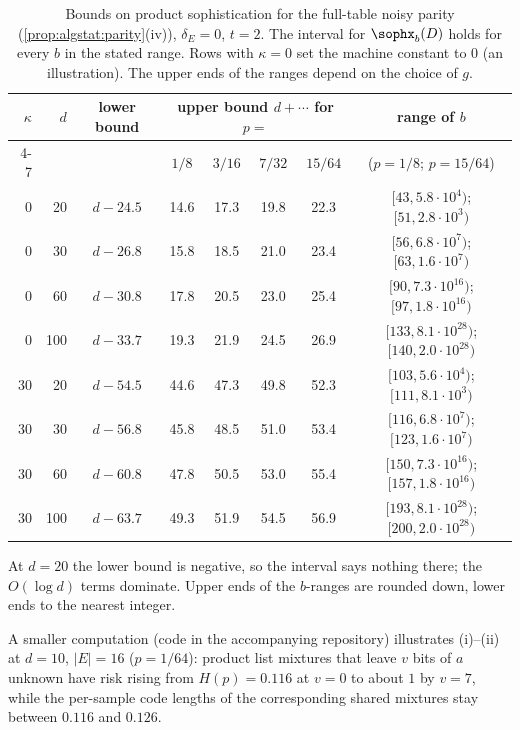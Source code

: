 \begin{table}[ht]
\centering\footnotesize\setlength{\tabcolsep}{3.5pt}
\caption{Bounds on product sophistication for the full-table noisy parity (\cref{prop:algstat:parity}(iv)), $\delta_E=0$, $t=2$. The interval for $\sophx_b(D)$ holds for every $b$ in the stated range. Rows with $\kappa=0$ set the machine constant to $0$ (an illustration). The upper ends of the ranges depend on the choice of $g$.}\label{tab:algstat:numbers}
\begin{tabular}{rrcccccc}
\toprule
$\kappa$ & $d$ & lower bound & \multicolumn{4}{c}{upper bound $d+\cdots$ for $p=$} & range of $b$ \\
\cmidrule(lr){4-7}
 & & & $1/8$ & $3/16$ & $7/32$ & $15/64$ & ($p=1/8$; $p=15/64$) \\
\midrule
0 & 20 & $d-24.5$ & 14.6 & 17.3 & 19.8 & 22.3 & $[43,5.8\cdot10^{4})$; $[51,2.8\cdot10^{3})$ \\
0 & 30 & $d-26.8$ & 15.8 & 18.5 & 21.0 & 23.4 & $[56,6.8\cdot10^{7})$; $[63,1.6\cdot10^{7})$ \\
0 & 60 & $d-30.8$ & 17.8 & 20.5 & 23.0 & 25.4 & $[90,7.3\cdot10^{16})$; $[97,1.8\cdot10^{16})$ \\
0 & 100 & $d-33.7$ & 19.3 & 21.9 & 24.5 & 26.9 & $[133,8.1\cdot10^{28})$; $[140,2.0\cdot10^{28})$ \\
30 & 20 & $d-54.5$ & 44.6 & 47.3 & 49.8 & 52.3 & $[103,5.6\cdot10^{4})$; $[111,8.1\cdot10^{3})$ \\
30 & 30 & $d-56.8$ & 45.8 & 48.5 & 51.0 & 53.4 & $[116,6.8\cdot10^{7})$; $[123,1.6\cdot10^{7})$ \\
30 & 60 & $d-60.8$ & 47.8 & 50.5 & 53.0 & 55.4 & $[150,7.3\cdot10^{16})$; $[157,1.8\cdot10^{16})$ \\
30 & 100 & $d-63.7$ & 49.3 & 51.9 & 54.5 & 56.9 & $[193,8.1\cdot10^{28})$; $[200,2.0\cdot10^{28})$ \\
\bottomrule
\end{tabular}
\end{table}

At $d=20$ the lower bound is negative, so the interval says nothing there; the $O(\log d)$ terms dominate. Upper ends of the $b$-ranges are rounded down, lower ends to the nearest integer.

A smaller computation (code in the accompanying repository) illustrates (i)--(ii) at $d=10$, $|E|=16$ ($p=1/64$): product list mixtures that leave $v$ bits of $a$ unknown have risk rising from $H(p)=0.116$ at $v=0$ to about $1$ by $v=7$, while the per-sample code lengths of the corresponding shared mixtures stay between $0.116$ and $0.126$.
